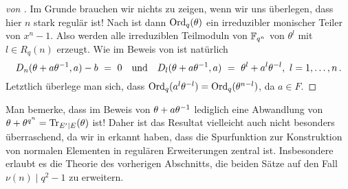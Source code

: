\begin{proof}[von ]
  Im Grunde brauchen wir nichts zu zeigen, wenn wir uns überlegen, dass
  hier $n$ stark regulär ist! Nach 
  ist dann $\operatorname{Ord}_q(\theta)$ ein irreduzibler monischer Teiler von $x^n-1$. Also
  werden alle irreduziblen Teilmoduln von $\mathbb{F}_{q^n}$ von $\theta^l$ mit 
  $l\in R_q(n)$ erzeugt.  Wie im Beweis von  ist
  natürlich 
  \[ D_n(\theta+a\theta\inv,a)-b \speq= 0 \quad\text{und}\quad
    D_l(\theta+a\theta\inv,a) \speq= \theta^l+a^l\theta^{-l},\ l=1,\ldots,n\,. \]
  Letztlich überlege man sich, dass $\operatorname{Ord}_q(a^l\theta^{-l}) =
  \operatorname{Ord}_q(\theta^{n-l})$, da $a \in F$. 
\end{proof}


Man bemerke, dass im Beweis von 
$\theta + a\theta^{-1}$ lediglich eine
Abwandlung von $\theta + \theta^{q^n} = \operatorname{Tr}_{E'\mid E}(\theta)$ ist!
Daher ist das Resultat vielleicht auch nicht besonders überraschend,
da wir in  erkannt haben, dass die Spurfunktion
zur Konstruktion von normalen Elementen in regulären Erweiterungen zentral ist.
Insbesondere erlaubt es die Theorie des vorherigen Abschnitts, die beiden Sätze 
auf den Fall $\nu(n)\mid q^2-1$ zu erweitern.

